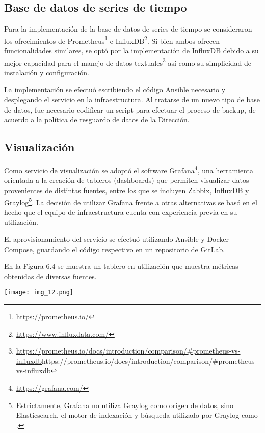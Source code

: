 \subsection{Base de datos de series de tiempo}

Para la implementación de la base de datos de series de tiempo se
consideraron los ofrecimientos de Prometheus\footnote{
  \href{https://prometheus.io/}{https://prometheus.io/} } e
InfluxDB\footnote{
  \href{https://www.influxdata.com/}{https://www.influxdata.com/}
}. Si bien ambos ofrecen funcionalidades similares, se optó por la
implementación de InfluxDB debido a su mejor capacidad para el manejo
de datos textuales\footnote{
  \url{https://prometheus.io/docs/introduction/comparison/\#prometheus-vs-influxdb}{https://prometheus.io/docs/introduction/comparison/\#prometheus-vs-influxdb}
} así como su simplicidad de instalación y configuración.

La implementación se efectuó escribiendo el código Ansible necesario y
desplegando el servicio en la infraestructura. Al tratarse de un nuevo
tipo de base de datos, fue necesario codificar un script para efectuar
el proceso de backup, de acuerdo a la política de resguardo de datos
de la Dirección.

\subsection{Visualización}

Como servicio de visualización se adoptó el software Grafana\footnote{
  \href{https://grafana.com/}{https://grafana.com/} }, una herramienta
orientada a la creación de tableros (dashboards) que permiten
visualizar datos provenientes de distintas fuentes, entre los que se
incluyen Zabbix, InfluxDB y Graylog\footnote{ Estrictamente, Grafana
  no utiliza Graylog como origen de datos, sino Elasticsearch, el
  motor de indexación y búsqueda utilizado por Graylog como
  .}. La decisión de utilizar Grafana frente a otras
alternativas se basó en el hecho que el equipo de infraestructura
cuenta con experiencia previa en su utilización.

El aprovisionamiento del servicio se efectuó utilizando Ansible y
Docker Compose, guardando el código respectivo en un repositorio de
GitLab.

En la Figura 6.4 se muestra un tablero en utilización que muestra
métricas obtenidas de diversas fuentes.

\texttt{[image: img\_12.png]}


